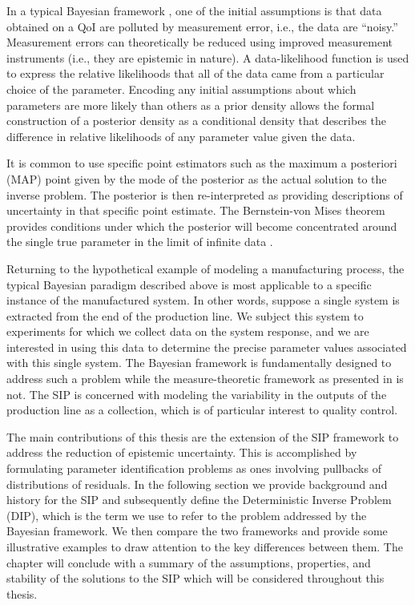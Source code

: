 In a typical Bayesian framework \citep{0266-5611-7-5-003,
  Kennedy_O_JRSSSB_2001, Tarantola_book, MNR07, CDS10, starktenorio,
  AlexanderianPetraStadlerEtAl14, Bui-ThanhGhattas14, Ernst2014,
  0266-5611-30-11-110301, ROM:CMW_2016, Stuart10,
  cockayneoatessullivangirolami}, one of the initial assumptions is that data obtained on a QoI are polluted by measurement error, i.e., the data are ``noisy.''
  Measurement errors can theoretically be reduced using improved measurement instruments (i.e., they are epistemic in nature).
  A data-likelihood function is used to express the relative likelihoods that all of the data came from a particular choice of the parameter.
  Encoding any initial assumptions about which parameters are more likely than others as a prior density allows the formal construction of a posterior density as a conditional density that describes the difference in relative likelihoods of any parameter value given the data.

It is common to use specific point estimators such as the maximum a posteriori (MAP) point given by the mode of the posterior as the actual solution to the inverse problem.
The posterior is then re-interpreted as providing descriptions of uncertainty in that specific point estimate.
The Bernstein-von Mises theorem \citep{vonmises} provides conditions under which the posterior will become concentrated around the single true parameter in the limit of infinite data \citep{Smith}.

Returning to the hypothetical example of modeling a manufacturing process, the typical Bayesian paradigm described above is most applicable to a specific instance of the manufactured system.
In other words, suppose a single system is extracted from the end of the production line.
We subject this system to experiments for which we collect data on the system response, and we are interested in using this data to determine the precise parameter values associated with this single system.
The Bayesian framework is fundamentally designed to address such a problem while the measure-theoretic framework as presented in \cite{BJW18a, BJW18b, BWY20} is not.
The SIP is concerned with modeling the variability in the outputs of the production line as a collection, which is of particular interest to quality control.

The main contributions of this thesis are the extension of the SIP framework to address the reduction of epistemic uncertainty.
This is accomplished by formulating parameter identification problems as ones involving pullbacks of distributions of residuals.
In the following section we provide background and history for the SIP and subsequently define the Deterministic Inverse Problem (DIP), which is the term we use to refer to the problem addressed by the Bayesian framework.
We then compare the two frameworks and provide some illustrative examples to draw attention to the key differences between them.
The chapter will conclude with a summary of the assumptions, properties, and stability of the solutions to the SIP which will be considered throughout this thesis.

\FloatBarrier
